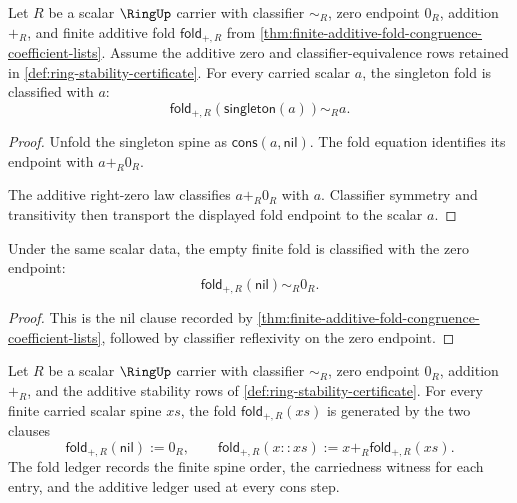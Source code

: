 \begin{lemma}
\label{lem:finite-additive-fold-singleton-identity}
Let $R$ be a scalar $\RingUp$ carrier with classifier $\sim_R$, zero endpoint
$0_R$, addition $+_R$, and finite additive fold $\mathsf{fold}_{+,R}$ from
\autoref{thm:finite-additive-fold-congruence-coefficient-lists}. Assume the
additive zero and classifier-equivalence rows retained in
\autoref{def:ring-stability-certificate}.
For every carried scalar $a$, the singleton fold is classified with $a$:
$$
\mathsf{fold}_{+,R}(\mathsf{singleton}(a))\sim_R a.
$$
\end{lemma}
\begin{proof}
Unfold the singleton spine as $\mathsf{cons}(a,\mathsf{nil})$. The fold equation
identifies its endpoint with $a+_R0_R$.

The additive right-zero law classifies $a+_R0_R$ with $a$. Classifier symmetry
and transitivity then transport the displayed fold endpoint to the scalar $a$.
\end{proof}

\begin{lemma}
\label{lem:finite-additive-fold-empty-identity}
Under the same scalar data, the empty finite fold is classified with the zero
endpoint:
$$
\mathsf{fold}_{+,R}(\mathsf{nil})\sim_R0_R.
$$
\end{lemma}
\begin{proof}
This is the nil clause recorded by
\autoref{thm:finite-additive-fold-congruence-coefficient-lists}, followed by
classifier reflexivity on the zero endpoint.
\end{proof}

\begin{definition}
\label{def:finite-additive-scalar-fold}
Let $R$ be a scalar $\RingUp$ carrier with classifier $\sim_R$, zero endpoint
$0_R$, addition $+_R$, and the additive stability rows of
\autoref{def:ring-stability-certificate}. For every finite carried scalar spine
$xs$, the fold $\mathsf{fold}_{+,R}(xs)$ is generated by the two clauses
$$
\mathsf{fold}_{+,R}(\mathsf{nil}) := 0_R,
\qquad
\mathsf{fold}_{+,R}(x::xs) := x+_R\mathsf{fold}_{+,R}(xs).
$$
The fold ledger records the finite spine order, the carriedness witness for
each entry, and the additive ledger used at every cons step.
\end{definition}

